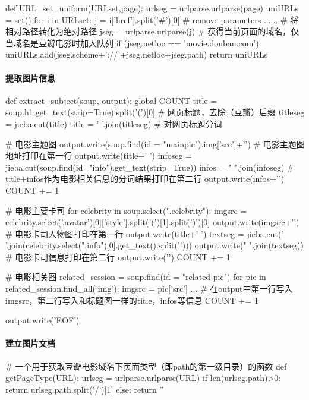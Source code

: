 \documentclass{article}
\begin{document}
\begin{python}
def URL_set_uniform(URLset,page):
    urlseg = urlparse.urlparse(page)
    uniURLs = set()
    for i in URLset:
        j = i['href'].split('#')[0]      # remove parameters
        ......                           # 将相对路径转化为绝对路径
        jseg = urlparse.urlparse(j)      # 获得当前页面的域名，仅当域名是豆瓣电影时加入队列
        if (jseg.netloc == 'movie.douban.com'):
            uniURLs.add(jseg.scheme+'://'+jseg.netloc+jseg.path)
    return uniURLs
\end{python}


\paragraph{提取图片信息}

\begin{python}
def extract_subject(soup, output):
    global COUNT
    title = soup.h1.get_text(strip=True).split('(')[0]          # 网页标题，去除（豆瓣）后缀
    titleseg = jieba.cut(title)
    title = ' '.join(titleseg)                                  # 对网页标题分词

    # 电影主题图
    output.write(soup.find(id = "mainpic").img['src']+'\n')     # 电影主题图地址打印在第一行
    output.write(title+' ')
    infoseg = jieba.cut(soup.find(id="info").get_text(strip=True))
    infos = " ".join(infoseg)              # title+infos作为电影相关信息的分词结果打印在第二行
    output.write(infos+'\n')
    COUNT += 1
    
    # 电影主要卡司
    for celebrity in soup.select(".celebrity"):
        imgsrc = celebrity.select('.avatar')[0]['style'].split('(')[1].split(')')[0]
        output.write(imgsrc+'\n')                               # 电影卡司人物图打印在第一行
        output.write(title+' ')
        textseg = jieba.cut(' '.join(celebrity.select(".info")[0].get_text().split('\n')))
        output.write(" ".join(textseg))                         # 电影卡司信息打印在第二行
        output.write('\n')
        COUNT += 1
        
    # 电影相关图
    related_session = soup.find(id = "related-pic")
    for pic in related_session.find_all('img'):
        imgsrc = pic['src']
        ...    # 在output中第一行写入imgsrc，第二行写入和标题图一样的title，infos等信息
        COUNT += 1

    output.write('EOF')
\end{python}


\paragraph{建立图片文档}
\begin{python}
# 一个用于获取豆瓣电影域名下页面类型（即path的第一级目录）的函数
def getPageType(URL):
    urlseg = urlparse.urlparse(URL)
    if len(urlseg.path)>0:
        return urlseg.path.split('/')[1]
    else:
        return ''
\end{python}
\end{document}
